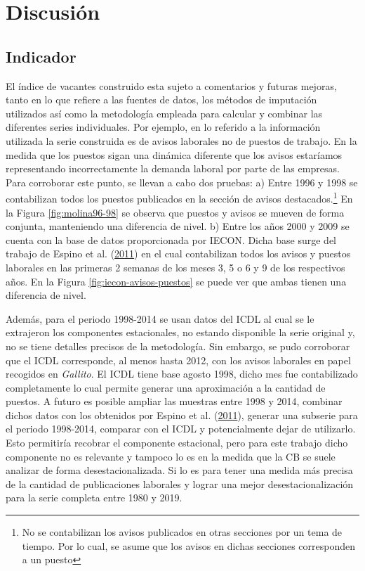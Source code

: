 \documentclass[12pt,oneside]{reedthesis}
\begin{document}
\hypertarget{cap:Discusion}{%
\chapter{Discusión}\label{cap:Discusion}}

\hypertarget{indicador}{%
\section{Indicador}\label{indicador}}

El índice de vacantes construido esta sujeto a comentarios y futuras mejoras, tanto en lo que refiere a las fuentes de datos, los métodos de imputación utilizados así como la metodología empleada para calcular y combinar las diferentes series individuales. Por ejemplo, en lo referido a la información utilizada la serie construida es de avisos laborales no de puestos de trabajo. En la medida que los puestos sigan una dinámica diferente que los avisos estaríamos representando incorrectamente la demanda laboral por parte de las empresas. Para corroborar este punto, se llevan a cabo dos pruebas: a) Entre 1996 y 1998 se contabilizan todos los puestos publicados en la sección de avisos destacados.\footnote{No se contabilizan los avisos publicados en otras secciones por un tema de tiempo. Por lo cual, se asume que los avisos en dichas secciones corresponden a un puesto} En la Figura \ref{fig:molina96-98} se observa que puestos y avisos se mueven de forma conjunta, manteniendo una diferencia de nivel. b) Entre los años 2000 y 2009 se cuenta con la base de datos proporcionada por IECON. Dicha base surge del trabajo de Espino et al. (\protect\hyperlink{ref-Alma2011}{2011}) en el cual contabilizan todos los avisos y puestos laborales en las primeras 2 semanas de los meses 3, 5 o 6 y 9 de los respectivos años. En la Figura \ref{fig:iecon-avisos-puestos} se puede ver que ambas tienen una diferencia de nivel.

Además, para el periodo 1998-2014 se usan datos del ICDL al cual se le extrajeron los componentes estacionales, no estando disponible la serie original y, no se tiene detalles precisos de la metodología. Sin embargo, se pudo corroborar que el ICDL corresponde, al menos hasta 2012, con los avisos laborales en papel recogidos en \emph{Gallito}. El ICDL tiene base agosto 1998, dicho mes fue contabilizado completamente lo cual permite generar una aproximación a la cantidad de puestos. A futuro es posible ampliar las muestras entre 1998 y 2014, combinar dichos datos con los obtenidos por Espino et al. (\protect\hyperlink{ref-Alma2011}{2011}), generar una subserie para el periodo 1998-2014, comparar con el ICDL y potencialmente dejar de utilizarlo. Esto permitiría recobrar el componente estacional, pero para este trabajo dicho componente no es relevante y tampoco lo es en la medida que la CB se suele analizar de forma desestacionalizada. Si lo es para tener una medida más precisa de la cantidad de publicaciones laborales y lograr una mejor desestacionalización para la serie completa entre 1980 y 2019.
\end{document}
